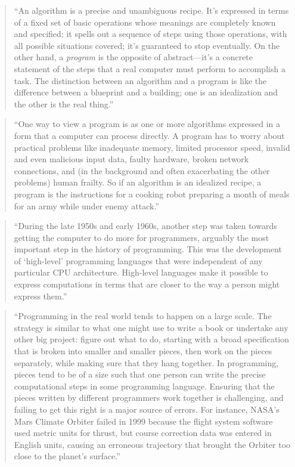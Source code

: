 \documentclass[]{tufte-book}
\begin{document}
\begin{quote}
``An algorithm is a precise and unambiguous recipe. It's expressed in terms of a fixed
set of basic operations whose meanings are completely known and specified; it spells out
a sequence of steps using those operations, with all possible situations covered; it's
guaranteed to stop eventually. On the other hand, a \emph{program} is the opposite of
abstract---it's a concrete statement of the steps that a real computer must perform to
accomplish a task. The distinction between an algorithm and a program is like the difference
between a blueprint and a building; one is an idealization and the other is the real thing.''
\citep{kernighan2011d}
\end{quote}

\begin{quote}
``One way to view a program is as one or more algorithms expressed in a form that a computer
can process directly. A program has to worry about practical problems like inadequate memory,
limited processor speed, invalid and even malicious input data, faulty hardware, broken
network connections, and (in the background and often exacerbating the other problems)
human frailty. So if an algorithm is an idealized recipe, a program is the instructions for
a cooking robot preparing a month of meals for an army while under enemy attack.'' \citep{kernighan2011d}
\end{quote}

\begin{quote}
``During the late 1950s and early 1960s, another step was taken towards getting the
computer to do more for programmers, arguably the most important step in the history of
programming. This was the development of `high-level' programming languages that were
independent of any particular CPU architecture. High-level languages make it possible to
express computations in terms that are closer to the way a person might express them.''
\citep{kernighan2011d}
\end{quote}

\begin{quote}
``Programming in the real world tends to happen on a large scale. The strategy is similar
to what one might use to write a book or undertake any other big project: figure out what
to do, starting with a broad specification that is broken into smaller and smaller pieces,
then work on the pieces separately, while making sure that they hang together. In programming,
pieces tend to be of a size such that one person can write the precise computational steps
in some programming language. Ensuring that the pieces written by different programmers
work together is challenging, and failing to get this right is a major source of errors.
For instance, NASA's Mars Climate Orbiter failed in 1999 because the flight system software
used metric units for thrust, but course correction data was entered in English units,
causing an erroneous trajectory that brought the Orbiter too close to the planet's
surface.'' \citep{kernighan2011d}
\end{quote}
\end{document}
